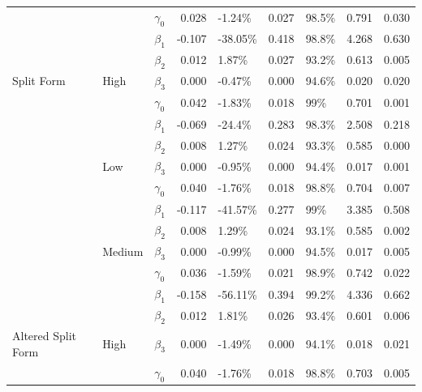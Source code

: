 \documentclass{svjour3}\usepackage[]{graphicx}\usepackage[]{color}
\newenvironment{knitrout}{}{} %
\begin{document}
\begin{knitrout}
\begin{table}[!h]
{\begin{tabular}[t]{l|l|l|r|l|r|l|r|r}
 &  & $\gamma_0$ & 0.028 & -1.24\% & 0.027 & 98.5\% & 0.791 & 0.030\\

 &  & $\beta_1$ & -0.107 & -38.05\% & 0.418 & 98.8\% & 4.268 & 0.630\\

 &  & $\beta_2$ & 0.012 & 1.87\% & 0.027 & 93.2\% & 0.613 & 0.005\\

\multirow{-12}{*}{\raggedright\arraybackslash Split Form} & \multirow{-4}{*}{\raggedright\arraybackslash High} & $\beta_3$ & 0.000 & -0.47\% & 0.000 & 94.6\% & 0.020 & 0.020\\
\cline{1-9}
 &  & $\gamma_0$ & 0.042 & -1.83\% & 0.018 & 99\% & 0.701 & 0.001\\

 &  & $\beta_1$ & -0.069 & -24.4\% & 0.283 & 98.3\% & 2.508 & 0.218\\

 &  & $\beta_2$ & 0.008 & 1.27\% & 0.024 & 93.3\% & 0.585 & 0.000\\

 & \multirow{-4}{*}{\raggedright\arraybackslash Low} & $\beta_3$ & 0.000 & -0.95\% & 0.000 & 94.4\% & 0.017 & 0.001\\

 &  & $\gamma_0$ & 0.040 & -1.76\% & 0.018 & 98.8\% & 0.704 & 0.007\\

 &  & $\beta_1$ & -0.117 & -41.57\% & 0.277 & 99\% & 3.385 & 0.508\\

 &  & $\beta_2$ & 0.008 & 1.29\% & 0.024 & 93.1\% & 0.585 & 0.002\\

 & \multirow{-4}{*}{\raggedright\arraybackslash Medium} & $\beta_3$ & 0.000 & -0.99\% & 0.000 & 94.5\% & 0.017 & 0.005\\

 &  & $\gamma_0$ & 0.036 & -1.59\% & 0.021 & 98.9\% & 0.742 & 0.022\\

 &  & $\beta_1$ & -0.158 & -56.11\% & 0.394 & 99.2\% & 4.336 & 0.662\\

 &  & $\beta_2$ & 0.012 & 1.81\% & 0.026 & 93.4\% & 0.601 & 0.006\\

\multirow{-12}{*}{\raggedright\arraybackslash Altered Split Form} & \multirow{-4}{*}{\raggedright\arraybackslash High} & $\beta_3$ & 0.000 & -1.49\% & 0.000 & 94.1\% & 0.018 & 0.021\\
\cline{1-9}
 &  & $\gamma_0$ & 0.040 & -1.76\% & 0.018 & 98.8\% & 0.703 & 0.005\\


\end{tabular}}
\end{table}
\end{knitrout}
\end{document}

